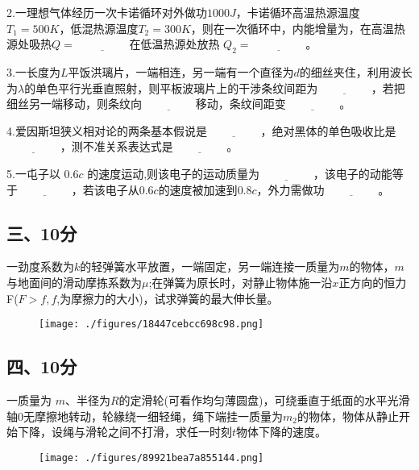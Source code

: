 2.一理想气体经历一次卡诺循环对外做功$1000J$，卡诺循环高温热源温度$T_1=500K$，低混热源温度$T_2=300K$，则在一次循环中，内能增量为，在高温热源处吸热$Q=\underline{\hspace{2cm}}$在低温热源处放热 $Q_2=\underline{\hspace{2cm}}$。

3.一长度为$L$平饭洪璃片，一端相连，另一端有一个直径为$d$的细丝夹住，利用波长为$\lambda$的单色平行光垂直照射，则平板波璃片上的干涉条纹间距为$\underline{\hspace{2cm}}$，若把细丝另一端移动，则条纹向$\underline{\hspace{2cm}}$移动，条纹间距变$\underline{\hspace{2cm}}$。

4.爱因斯坦狭义相对论的两条基本假说是$\underline{\hspace{2cm}}$，绝对黑体的单色吸收比是$\underline{\hspace{2cm}}$，测不准关系表达式是$\underline{\hspace{2cm}}$。

5.一屯子以 $0.6c$ 的速度运动,则该电子的运动质量为$\underline{\hspace{2cm}}$，该电子的动能等于$\underline{\hspace{2cm}}$，若该电子从$0.6c$的速度被加速到$0.8c$，外力需做功$\underline{\hspace{2cm}}$。
\subsection{三、10分}
一劲度系数为$k$的轻弹簧水平放置，一端固定，另一端连接一质量为$m$的物体，$m$ 与地面间的滑动摩拣系数为$\mu$;在弹簧为原长时，对静止物体施一沿$x$正方向的恒力F($F>f,f$,为摩擦力的大小)，试求弹簧的最大伸长量。
\begin{figure}[ht]
\centering
\texttt{[image: ./figures/18447cebcc698c98.png]}
\caption{} \label{fig_NJU_2}
\end{figure}
\subsection{四、10分}
一质量为 $m$、半径为$R$的定滑轮(可看作均匀薄圆盘)，可绕垂直于纸面的水平光滑轴0无摩擦地转动，轮緣绕一细轻绳，绳下端挂一质量为$m_2$的物体，物体从静止开始下降，设绳与滑轮之间不打滑，求任一时刻$t$物体下降的速度。
\begin{figure}[ht]
\centering
\texttt{[image: ./figures/89921bea7a855144.png]}
\caption{} \label{fig_NJU_3}
\end{figure}
